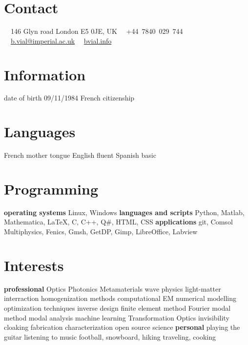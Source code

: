 \documentclass{cv}
\begin{document}

\begin{aside} %
	\section{Contact}
	\faHome~~146 Glyn road
	London E5 0JE, UK
	\faPhone~~+44~7840~029~744
	\faEnvelope~~\href{mailto:b.vial@imperial.ac.uk}{b.vial@imperial.ac.uk}
	\faUser~~\href{http://bvial.info/}{bvial.info}
	\section{Information}
	date of birth 09/11/1984
	French citizenship
	\section{Languages}
	French mother tongue
	English fluent
	Spanish basic
	\section{Programming}
	\textbf{operating systems}
	Linux, Windows
	\textbf{languages and scripts}
	Python, Matlab, Mathematica, \LaTeX, C, C++, Q\#, HTML, CSS
	\textbf{applications}
	git, Comsol Multiphysics, Fenics, Gmsh, GetDP, Gimp, LibreOffice, Labview
	\section{Interests}
	\textbf{professional}
	Optics
	Photonics
	Metamaterials
	wave physics
	light-matter interraction
	homogenization methods
	computational EM
	numerical modelling
	optimization techniques
	inverse design
	finite element method
	Fourier modal method
	modal analysis
	machine learning
	Transformation Optics
	invisibility cloaking
	fabrication
	characterization
	open source science
	\textbf{personal}
	playing the guitar
	listening to music
	football, snowboard, hiking
	traveling, cooking
\end{aside}
\end{document}
